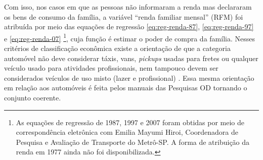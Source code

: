 \begin{quadro}[htb]
\end{quadro}

Com isso, nos casos em que as pessoas não informaram a renda mas declararam os bens de consumo da família, a  variável ``renda familiar mensal'' (RFM) foi atribuída por meio das equações de regressão \eqref{eq:reg-renda-87}, \eqref{eq:reg-renda-97} e \eqref{eq:reg-renda-07}%
\footnote{As equações de regressão de 1987, 1997 e 2007 foram obtidas por meio de correspondência eletrônica com Emilia Mayumi Hiroi, Coordenadora de Pesquisa e Avaliação de Transporte do Metrô-SP. A forma de atribuição da renda em 1977 ainda não foi disponibilizada.}, cuja função é estimar o poder de compra da família. Nesses critérios de classificação econômica existe a orientação de que a categoria automóvel não deve considerar táxis, vans, \emph{pickups} usadas para fretes ou qualquer veículo usado para atividades profissionais, nem tampouco devem ser considerados veículos de uso misto (lazer e profissional) \cite{CRITERIOBRASIL}. Essa mesma orientação em relação aos automóveis é feita pelos manuais das Pesquisas OD \cite{OD77, OD87, OD97, OD07} tornando o conjunto coerente.


